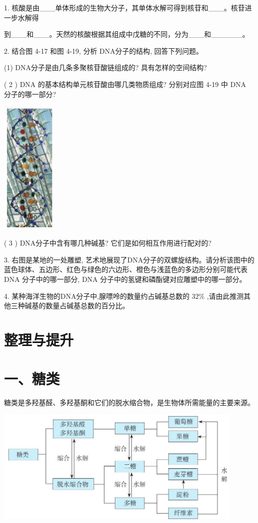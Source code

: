 \documentclass[10pt]{article}
\begin{document}
1. 核酸是由\_\_\_单体形成的生物大分子，其单体水解可得到核苷和\_\_\_。核苷进一步水解得

到\_\_\_和\_\_\_。天然的核酸根据其组成中戊糖的不同，分为\_\_\_和\_\_\_\_\_\_。

2. 结合图 4-17 和图 4-19, 分析 DNA分子的结构, 回答下列问题。

(1) DNA分子是由几条多聚核苷酸链组成的? 具有怎样的空间结构?

( 2 ) DNA 的基本结构单元核苷酸由哪几类物质组成? 分别对应图 4-19 中 DNA 分子的哪一部分?

\begin{center}
\includegraphics[max width=0.2\textwidth]{images/0190efc5-b58a-7c43-bfb0-e0a030df9cfd_131_951338.jpg}
\end{center}

( 3 ) DNA分子中含有哪几种碱基? 它们是如何相互作用进行配对的?

3. 右图是某地的一处雕塑, 艺术地展现了DNA分子的双螺旋结构。请分析该图中的蓝色球体、五边形、红色与绿色的六边形、橙色与浅蓝色的多边形分别可能代表 DNA 分子中的哪一部分, DNA 分子中的氢键和磷酯键对应雕塑中的哪一部分。

4. 某种海洋生物的DNA分子中,腺嘌呤的数量约占碱基总数的 \({32}\%\) ,请由此推测其他三种碱基的数量占碱基总数的百分比。

\section*{整理与提升}

\section*{一、糖类}

糖类是多羟基醛、多羟基酮和它们的脱水缩合物，是生物体所需能量的主要来源。

\begin{center}
\includegraphics[max width=0.9\textwidth]{images/0190efc5-b58a-7c43-bfb0-e0a030df9cfd_132_726206.jpg}
\end{center}
\end{document}
